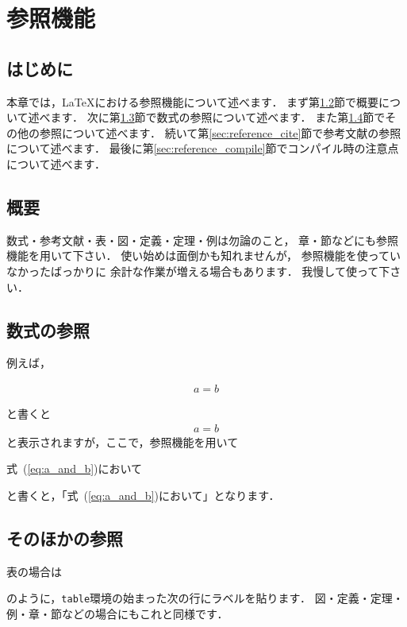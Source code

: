 \documentclass[a4j,12pt,dvipdfmx,oneside]{jsbook}
\theoremstyle{definition}
\begin{document}
\chapter{参照機能}\label{chap:reference}
%
%
%
\section{はじめに}\label{sec:reference_intro}
本章では，\LaTeX{}における参照機能について述べます．
まず第\ref{sec:reference_abst}節で概要について述べます．
次に第\ref{sec:reference_math}節で数式の参照について述べます．
また第\ref{sec:reference_misc}節でその他の参照について述べます．
続いて第\ref{sec:reference_cite}節で参考文献の参照について述べます．
最後に第\ref{sec:reference_compile}節でコンパイル時の注意点について述べます．
%
%
%
\section{概要}\label{sec:reference_abst}
%
%
%
数式・参考文献・表・図・定義・定理・例は勿論のこと，
章・節などにも参照機能を用いて下さい．
使い始めは面倒かも知れませんが，
参照機能を使っていなかったばっかりに
余計な作業が増える場合もあります．
我慢して使って下さい．
%
%
%
\section{数式の参照}\label{sec:reference_math}
%
%
%
例えば，
\begin{verbatimtab}
\begin{align}
a=b\label{eq:a_and_b} 
\end{align}
\end{verbatimtab}
と書くと
\begin{align}
a=b\label{eq:a_and_b} 
\end{align}
と表示されますが，ここで，参照機能を用いて
\begin{verbatimtab}
式~(\ref{eq:a_and_b})において
\end{verbatimtab}
と書くと，「式~(\ref{eq:a_and_b})において」となります．
%
%
%
\section{そのほかの参照}\label{sec:reference_misc}
%
%
%
表の場合は
\begin{verbatimtab}
\begin{table}[htbp]
\label{tab:this_table}
\end{verbatimtab}
のように，\texttt{table}環境の始まった次の行にラベルを貼ります．
図・定義・定理・例・章・節などの場合にもこれと同様です．
%
%
%
\end{document}
